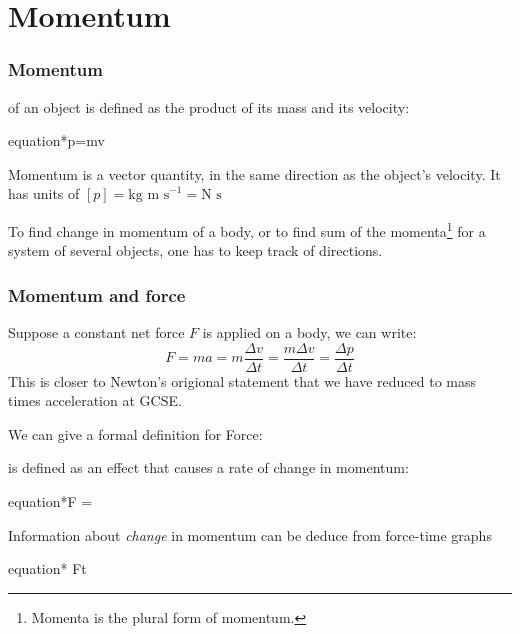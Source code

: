 \chapter{Momentum}

\subsection{Momentum}

\begin{ilight}
	\centering {} of an object is defined as the product of its mass and its velocity: \begin{empheq}[box=\tcbhighmath]{equation*}{p=mv}\end{empheq} 
\end{ilight}

Momentum is a vector quantity, in the same direction as the object's velocity. It has units of $[p]=\text{kg m s}^{-1} = \text{N s}$ 

To find change in momentum of a body, or to find sum of the momenta\footnote{Momenta is the plural form of momentum.} for a system of several objects, one has to keep track of directions. 

\subsection{Momentum and force}

Suppose a constant net force $F$ is applied on a body, we can write:
\begin{equation*}
	F = ma = m\frac{\Delta v}{\Delta t} = \frac{m\Delta v}{\Delta t} = \frac{\Delta p}{\Delta t}
\end{equation*}
This is closer to Newton's origional statement that we have reduced to mass times acceleration at GCSE. 

We can give a formal definition for Force:

\begin{ilight}
	\centering {} is defined as an effect that causes a rate of change in momentum: \begin{empheq}[box=\tcbhighmath]{equation*}{F = }\end{empheq}
\end{ilight}

Information about \emph{change} in momentum can be deduce from force-time graphs
	
{
	\centering

	\begin{empheq}[box=\tcbhighmath]{equation*}{  F\text{-}t  }\end{empheq}
	
}

